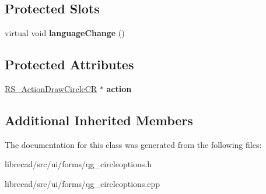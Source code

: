\subsection*{Protected Slots}
\begin{DoxyCompactItemize}
\item 
\hypertarget{classQG__CircleOptions_a7d3ba02e15e0682365612fc093cb06d4}{virtual void {\bfseries language\-Change} ()}\label{classQG__CircleOptions_a7d3ba02e15e0682365612fc093cb06d4}

\end{DoxyCompactItemize}
\subsection*{Protected Attributes}
\begin{DoxyCompactItemize}
\item 
\hypertarget{classQG__CircleOptions_a59d979032b12c770f6d6e79bee425601}{\hyperlink{classRS__ActionDrawCircleCR}{R\-S\-\_\-\-Action\-Draw\-Circle\-C\-R} $\ast$ {\bfseries action}}\label{classQG__CircleOptions_a59d979032b12c770f6d6e79bee425601}

\end{DoxyCompactItemize}
\subsection*{Additional Inherited Members}


The documentation for this class was generated from the following files\-:\begin{DoxyCompactItemize}
\item 
librecad/src/ui/forms/qg\-\_\-circleoptions.\-h\item 
librecad/src/ui/forms/qg\-\_\-circleoptions.\-cpp\end{DoxyCompactItemize}
